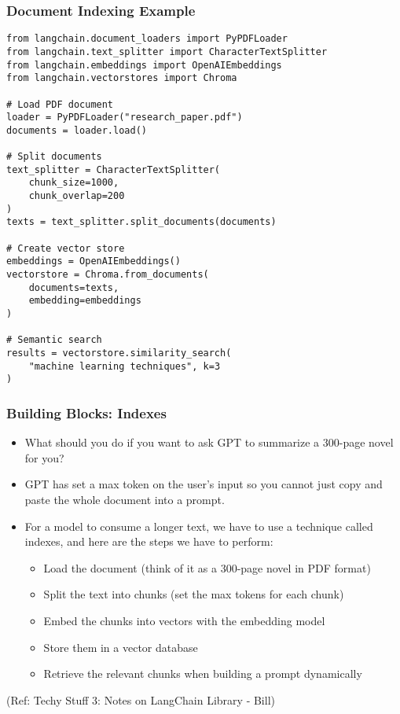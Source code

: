 \begin{frame}[fragile]\frametitle{Document Indexing Example}

\begin{lstlisting}
from langchain.document_loaders import PyPDFLoader
from langchain.text_splitter import CharacterTextSplitter
from langchain.embeddings import OpenAIEmbeddings
from langchain.vectorstores import Chroma

# Load PDF document
loader = PyPDFLoader("research_paper.pdf")
documents = loader.load()

# Split documents
text_splitter = CharacterTextSplitter(
    chunk_size=1000, 
    chunk_overlap=200
)
texts = text_splitter.split_documents(documents)

# Create vector store
embeddings = OpenAIEmbeddings()
vectorstore = Chroma.from_documents(
    documents=texts, 
    embedding=embeddings
)

# Semantic search
results = vectorstore.similarity_search(
    "machine learning techniques", k=3
)
\end{lstlisting}

\end{frame}


\begin{frame}[fragile]\frametitle{Building Blocks: Indexes}

\begin{itemize}
\item What should you do if you want to ask GPT to summarize a 300-page novel for you? 
\item GPT has set a max token on the user’s input so you cannot just copy and paste the whole document into a prompt. 
\item For a model to consume a longer text, we have to use a technique called indexes, and here are the steps we have to perform:
\begin{itemize}
\item Load the document (think of it as a 300-page novel in PDF format)
\item Split the text into chunks (set the max tokens for each chunk)
\item Embed the chunks into vectors with the embedding model
\item Store them in a vector database
\item Retrieve the relevant chunks when building a prompt dynamically
\end{itemize}
\end{itemize}

{\tiny (Ref: Techy Stuff 3: Notes on LangChain Library - Bill)}

\end{frame}


